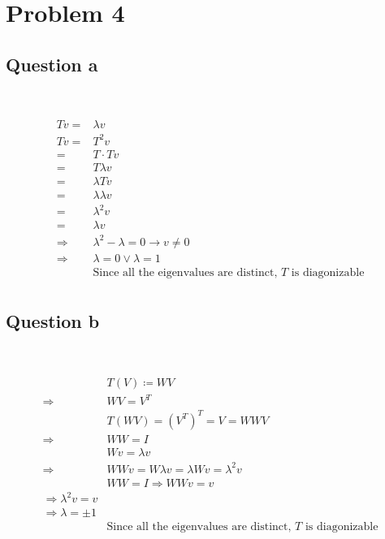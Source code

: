 \documentclass{article}
\begin{document}
\newpage

\section{Problem 4}

\subsection{Question a}

~

\begin{equation*}
    \begin{split}
        Tv=&\lambda v\\
        Tv=&T^2v\\
        =&T\cdot Tv\\
        =&T\lambda v\\
        =&\lambda Tv\\
        =&\lambda \lambda v\\
        =&\lambda^2v\\
        =&\lambda v\\
        \Rightarrow &\lambda^2-\lambda=0 \rightarrow v\ne 0\\
        \Rightarrow &\lambda = 0\lor \lambda=1\\
        &\text{Since all the eigenvalues are distinct, }T\text{ is diagonizable}\\
    \end{split}
\end{equation*}

\subsection{Question b}

~

\begin{equation*}
    \begin{split}
        &T(V)\coloneqq WV\\
        \Rightarrow &WV=V^T\\
        &T(WV)=(V^T)^T=V=WWV\\
        \Rightarrow &WW=I\\
        &Wv=\lambda v\\
        \Rightarrow &WWv=W\lambda v=\lambda Wv=\lambda^2v\\
        &WW=I\Rightarrow WWv=v\\
        \Rightarrow \lambda^2v=v\\
        \Rightarrow \lambda =\pm 1\\
        &\text{Since all the eigenvalues are distinct, }T\text{ is diagonizable}\\
    \end{split}
\end{equation*}
\end{document}
